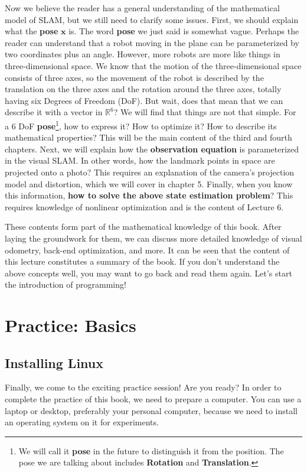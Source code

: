 Now we believe the reader has a general understanding of the mathematical model of SLAM, but we still need to clarify some issues. First, we should explain what the \textbf{pose} $\bm{x}$ is. The word \textbf{pose} we just said is somewhat vague. Perhaps the reader can understand that a robot moving in the plane can be parameterized by two coordinates plus an angle. However, more robots are more like things in three-dimensional space. We know that the motion of the three-dimensional space consists of three axes, so the movement of the robot is described by the translation on the three axes and the rotation around the three axes, totally having six Degrees of Freedom (DoF). But wait, does that mean that we can describe it with a vector in $\mathbb{R}^6$? We will find that things are not that simple. For a 6 DoF \textbf{pose}\footnote{We will call it \textbf{pose} in the future to distinguish it from the position. The pose we are talking about includes \textbf{Rotation} and \textbf{Translation}. }, how to express it? How to optimize it? How to describe its mathematical properties?  This will be the main content of the third and fourth chapters. Next, we will explain how the \textbf{observation equation} is parameterized in the visual SLAM. In other words, how the landmark points in space are projected onto a photo? This requires an explanation of the camera's projection model and distortion, which we will cover in chapter 5. Finally, when you know this information, \textbf{how to solve the above state estimation problem}? This requires knowledge of nonlinear optimization and is the content of Lecture 6.
    
These contents form part of the mathematical knowledge of this book. After laying the groundwork for them, we can discuss more detailed knowledge of visual odometry, back-end optimization, and more. It can be seen that the content of this lecture constitutes a summary of the book. If you don't understand the above concepts well, you may want to go back and read them again. Let's start the introduction of programming!


\section{Practice: Basics}
\subsection{Installing Linux}
Finally, we come to the exciting practice session! Are you ready? In order to complete the practice of this book, we need to prepare a computer. You can use a laptop or desktop, preferably your personal computer, because we need to install an operating system on it for experiments.

